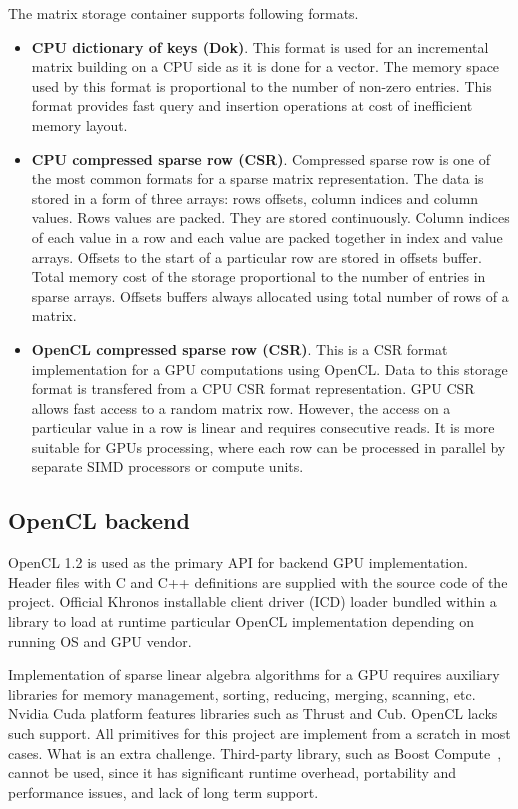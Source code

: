 The matrix storage container supports following formats.

\begin{itemize}
    \item \textbf{CPU dictionary of keys (Dok)}. This format is used for an incremental matrix building on a CPU side as it is done for a vector. The memory space used by this format is proportional to the number of non-zero entries. This format provides fast query and insertion operations at cost of inefficient memory layout.
    
    \item \textbf{CPU compressed sparse row (CSR)}. Compressed sparse row is one of the most common formats for a sparse matrix representation. The data is stored in a form of three arrays: rows offsets, column indices and column values. Rows values are packed. They are stored continuously. Column indices of each value in a row and each value are packed together in index and value arrays. Offsets to the start of a particular row are stored in offsets buffer. Total memory cost of the storage proportional to the number of entries in sparse arrays. Offsets buffers always allocated using total number of rows of a matrix. 
    
    \item \textbf{OpenCL compressed sparse row (CSR)}. This is a CSR format implementation for a GPU computations using OpenCL. Data to this storage format is transfered from a CPU CSR format representation. GPU CSR allows fast access to a random matrix row. However, the access on a particular value in a row is linear and requires consecutive reads. It is more suitable for GPUs processing, where each row can be processed in parallel by separate SIMD processors or compute units.
\end{itemize}

\subsection{OpenCL backend}

OpenCL 1.2 is used as the primary API for backend GPU implementation. Header files with C and C++ definitions are supplied with the source code of the project. Official Khronos installable client driver (ICD) loader bundled within a library to load at runtime particular OpenCL implementation depending on running OS and GPU vendor. 

Implementation of sparse linear algebra algorithms for a GPU requires auxiliary libraries for memory management, sorting, reducing, merging, scanning, etc. Nvidia Cuda platform features libraries such as Thrust and Cub. OpenCL lacks such support. All primitives for this project are implement from a scratch in most cases. What is an extra challenge. Third-party library, such as Boost Compute~\cite{article:boost_compute}, cannot be used, since it has significant runtime overhead, portability and performance issues, and lack of long term support.


